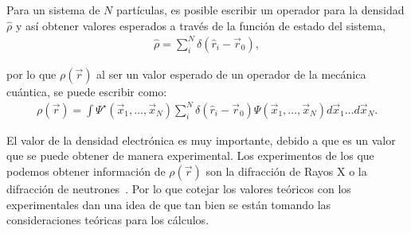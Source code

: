 Para un sistema de $N$ partículas, es posible escribir un operador para la
densidad $\hat{\rho}$ y así obtener valores esperados a través de la función de
estado del sistema,
%
\begin{align}
  \hat{\rho} = \sum_i ^N \delta (\hat{r}_i - \vec{r}_0),
\end{align}

\noindent por lo que $\rho (\vec{r})$ al ser un valor esperado de un operador
de la mecánica cuántica, se puede escribir como:
%
\begin{align}
  \rho (\vec{r})= \int\Psi^{\star} (\vec{x}_1, \ldots , \vec{x}_N)
  \sum_i ^N \delta (\hat{r}_i - \vec{r}_0) \Psi (\vec{x}_1, \ldots , \vec{x}_N)
  d\vec{x}_1 \ldots d\vec{x}_N .
\end{align}

El valor de la densidad electrónica es muy importante, debido a que es un valor
que se puede obtener de manera experimental. Los experimentos de los que
podemos obtener información de $\rho (\vec{r})$ son la difracción de Rayos X o
la difracción de neutrones~\cite{Kasai2018, Coppens1971}. Por lo que cotejar
los valores teóricos con los experimentales dan una idea de que tan bien se
están tomando las consideraciones teóricas para los cálculos.
%
% 
%
